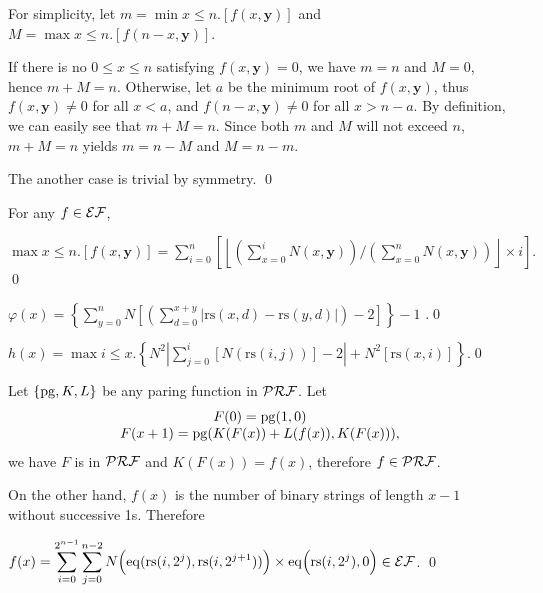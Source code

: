 \documentclass[11pt]{article}
\begin{document}

\begin{pf} \rm
 For simplicity, let $m=\min x\leq n.[f(x,\mathbf{y})]$ and $M=\max x\leq n.[f(n - x,\mathbf{y})]$.

If there is no $0\leq x\leq n$ satisfying $f(x,\mathbf{y})=0$, we have $m=n$ and $M=0$, hence
$m + M = n$. Otherwise, let $a$ be the minimum root of $f(x, \mathbf{y})$, thus 
$f(x, \mathbf{y})\neq 0$ for all $x<a$, and  $f(n - x, \mathbf{y})\neq 0$ for all $x > n - a$.
By definition, we can easily see that $m+M=n$. Since both $m$ and $M$ will not exceed $n$, 
$m+M=n$ yields $m = n - M$ and $M = n - m$. 

The another case is trivial by symmetry. \qed
\end{pf}


\begin{pf} \rm For any $f \in \mathcal{EF}$,

\noindent
$\displaystyle \max x \leq n.[f(x,\mathbf{y})]
= \sum_{i=0}^{n} \left[ \left\lfloor
  \left( \sum_{x=0}^{i} N(x, \mathbf{y}) \right)
   /
  \left( \sum_{x=0}^{n} N(x, \mathbf{y}) \right) \right\rfloor
  \times i
\right].
$ \qed
\end{pf}

\begin{pf} \rm
 $\displaystyle \varphi(x) = 
\left\{ \sum_{y=0}^{n} N\left[
\left( \sum_{d=0}^{x+y} \Big| \mathrm{rs}(x, d) - \mathrm{rs}(y, d)\Big| \right) - 2  \right]
\right\}
- 1$ .\qed
\end{pf}

\begin{pf} \rm
$\displaystyle h(x) = \max i\leq x. \left\{
N^2\left| \sum_{j = 0}^{i} [N(\mathrm{rs}(i, j))] - 2 \right|
+ N^2[\mathrm{rs}(x, i)] \right\}
$.\qed
\end{pf}

\begin{pf} \rm
  Let $\{\mathrm{pg}, K, L\}$ be any paring function in $\mathcal{PRF}$. Let
\[
\begin{array}{c}
F(0) = \mathrm{pg}( 1, 0 ) \\
F(x + 1) = \mathrm{pg}(K(F(x)) + L(f(x)),  K(F(x))),
\end{array}
\]
we have $F$ is in $\mathcal{PRF}$ and $K(F(x)) = f(x)$, therefore $f\in\mathcal{PRF}$. 

On the other hand, 
$f(x)$ is the number of binary strings of length $x-1$ without successive 1s. Therefore


$\displaystyle f(x) = \sum_{i=0}^{2^{n-1}} \sum_{j = 0}^{n - 2}
N\Big(\mathrm{eq} ( \mathrm{rs}(i, 2^j) , \mathrm{rs}(i, 2^{j + 1}))\Big) \times
\mathrm{eq} \Big( \mathrm{rs}(i, 2^j) , 0 \Big) \in \mathcal{EF}$.
\qed
\end{pf}
\end{document}

